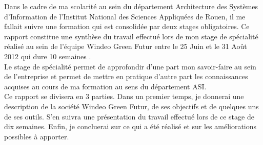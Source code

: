 
Dans le cadre de ma scolarité au sein du département Architecture des Systèmes d'Information de l'Institut National des Sciences Appliquées de Rouen, il me fallait suivre une formation qui est consolidée par deux stages obligatoires. Ce rapport constitue une synthèse du travail effectué lors de mon stage de spécialité réalisé au sein de l'équipe Windeo Green Futur entre le 25 Juin et le 31 Août 2012 qui dure 10 semaines .\\

Le stage de spécialité permet de approfondir d'une part mon savoir-faire au sein de l'entreprise et permet de mettre en pratique d'autre part les connaissances acquises au cours de ma formation au sens du département ASI.\\

Ce rapport se divisera en 3 parties. Dans un premier temps, je donnerai une description de la société Windeo Green Futur, de ses objectifs et de quelques uns de ses outils. S'en suivra une présentation du travail effectué lors de ce stage de dix semaines. Enfin, je concluerai sur ce qui a été réalisé et sur les améliorations possibles à apporter. 
